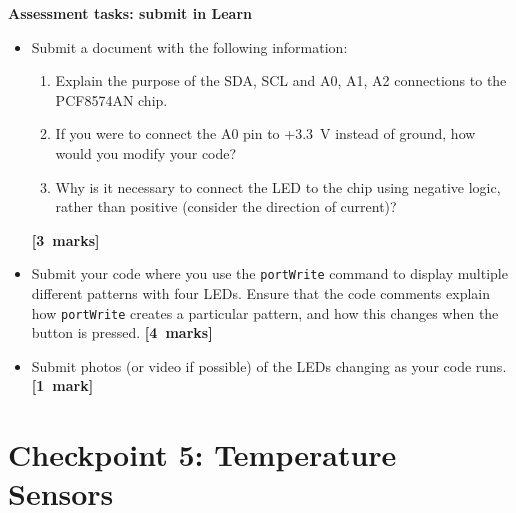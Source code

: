 \newpage
{\bf Assessment tasks: submit in Learn}

\begin{itemize}

\item Submit a document with the following information:
\begin{enumerate}
\item Explain the purpose of the SDA, SCL and A0, A1, A2 connections to the PCF8574AN chip.
\item If you were to connect the A0 pin to +3.3~V instead of ground, how would you modify your code?
\item Why is it necessary to connect the LED to the chip using negative logic, rather than positive (consider the direction of current)?
\end{enumerate}
\hfill {\bf[3~marks]}

\item Submit your code where you use the \texttt{portWrite} command to display multiple different patterns with four LEDs.
Ensure that the code comments explain how \texttt{portWrite} creates a particular pattern, and how this changes when the button is pressed.
\null\hfill {\bf[4~marks]}

\item Submit photos (or video if possible) of the LEDs changing as your code runs.
\null\hfill {\bf[1~mark]}

\end{itemize}


\newpage
\section{Checkpoint 5: Temperature Sensors}


